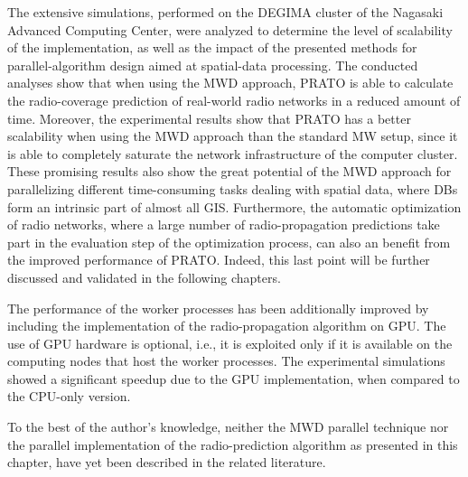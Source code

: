 The extensive simulations, performed on the DEGIMA cluster of the
Nagasaki Advanced Computing Center, were analyzed to determine the
level of scalability of the implementation, as well as the impact
of the presented methods for parallel-algorithm design aimed at spatial-data
processing. The conducted analyses show that when using the MWD approach,
PRATO is able to calculate the radio-coverage prediction of real-world
radio networks in a reduced amount of time. Moreover, the experimental
results show that PRATO has a better scalability when using the MWD
approach than the standard MW setup, since it is able to completely
saturate the network infrastructure of the computer cluster. These
promising results also show the great potential of the MWD approach
for parallelizing different time-consuming tasks dealing with spatial
data, where DBs form an intrinsic part of almost all GIS. Furthermore,
the automatic optimization of radio networks, where a large number
of radio-propagation predictions take part in the evaluation step
of the optimization process, can also an benefit from the improved
performance of PRATO. Indeed, this last point will be further discussed
and validated in the following chapters.

The performance of the worker processes has been additionally improved
by including the implementation of the radio-propagation algorithm
on GPU. The use of GPU hardware is optional, i.e., it is exploited
only if it is available on the computing nodes that host the worker
processes. The experimental simulations showed a significant speedup
due to the GPU implementation, when compared to the CPU-only version.

To the best of the author's knowledge, neither the MWD parallel technique
nor the parallel implementation of the radio-prediction algorithm
as presented in this chapter, have yet been described in the related
literature.
